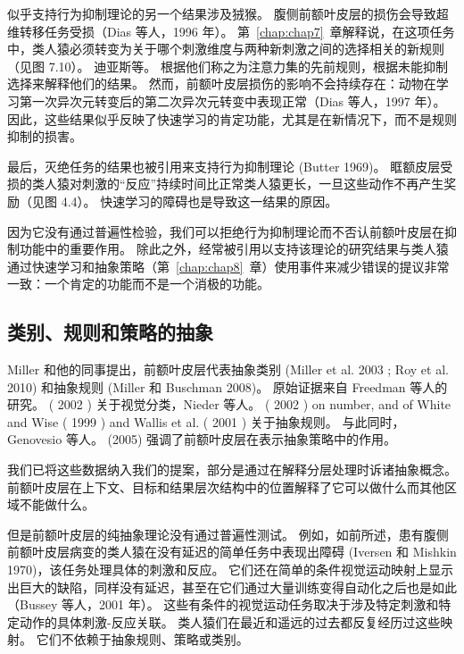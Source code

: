 似乎支持行为抑制理论的另一个结果涉及狨猴。
腹侧前额叶皮层的损伤会导致超维转移任务受损（Dias 等人，1996 年）。
第~\ref{chap:chap7}~章解释说，在这项任务中，类人猿必须转变为关于哪个刺激维度与两种新刺激之间的选择相关的新规则（见图 7.10）。
迪亚斯等。 根据他们称之为注意力集的先前规则，根据未能抑制选择来解释他们的结果。
然而，前额叶皮层损伤的影响不会持续存在：动物在学习第一次异次元转变后的第二次异次元转变中表现正常（Dias 等人，1997 年）。
因此，这些结果似乎反映了快速学习的肯定功能，尤其是在新情况下，而不是规则抑制的损害。
\par


最后，灭绝任务的结果也被引用来支持行为抑制理论 (Butter 1969)。
眶额皮层受损的类人猿对刺激的“反应”持续时间比正常类人猿更长，一旦这些动作不再产生奖励（见图 4.4）。 
快速学习的障碍也是导致这一结果的原因。
\par


因为它没有通过普遍性检验，我们可以拒绝行为抑制理论而不否认前额叶皮层在抑制功能中的重要作用。
除此之外，经常被引用以支持该理论的研究结果与类人猿通过快速学习和抽象策略（第~\ref{chap:chap8}~章）使用事件来减少错误的提议非常一致：一个肯定的功能而不是一个消极的功能。



\subsection{类别、规则和策略的抽象}

Miller 和他的同事提出，前额叶皮层代表抽象类别 (Miller et al. 2003 ; Roy et al. 2010) 和抽象规则 (Miller 和 Buschman 2008)。 原始证据来自 Freedman 等人的研究。 ( 2002 ) 关于视觉分类，Nieder 等人。 ( 2002 ) on number, and of White and Wise ( 1999 ) and Wallis et al. ( 2001 ) 关于抽象规则。
与此同时，Genovesio 等人。 (2005) 强调了前额叶皮层在表示抽象策略中的作用。
\par


我们已将这些数据纳入我们的提案，部分是通过在解释分层处理时诉诸抽象概念。
前额叶皮层在上下文、目标和结果层次结构中的位置解释了它可以做什么而其他区域不能做什么。
\par


但是前额叶皮层的纯抽象理论没有通过普遍性测试。
例如，如前所述，患有腹侧前额叶皮层病变的类人猿在没有延迟的简单任务中表现出障碍 (Iversen 和 Mishkin 1970)，该任务处理具体的刺激和反应。
它们还在简单的条件视觉运动映射上显示出巨大的缺陷，同样没有延迟，甚至在它们通过大量训练变得自动化之后也是如此（Bussey 等人，2001 年）。
这些有条件的视觉运动任务取决于涉及特定刺激和特定动作的具体刺激-反应关联。
类人猿们在最近和遥远的过去都反复经历过这些映射。 它们不依赖于抽象规则、策略或类别。
\par


